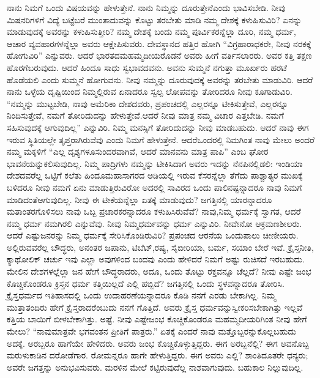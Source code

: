 ನಾನು ನಿಮಗೆ ಒಂದು ವಿಷಯವನ್ನು ಹೇಳುತ್ತೇನೆ. ನಾನು ನಿಮ್ಮನ್ನು ದೂರುತ್ತೇನೆ\break ಎಂದು ಭಾವಿಸಬೇಡಿ. ನೀವು ಮಿಷನರಿಗಳಿಗೆ ವಿದ್ಯೆ ಬಟ್ಟೆಬರೆ ಮುಂತಾದುವನ್ನು ಕೊಟ್ಟು ತರಬೇತು ಮಾಡಿ ನಮ್ಮ ದೇಶಕ್ಕೆ ಕಳುಹಿಸುವಿರಿ? ಏನನ್ನು ಮಾಡುವುದಕ್ಕೆ ಅವರನ್ನು ಕಳುಹಿಸುತ್ತೀರಿ? ನಮ್ಮ ದೇಶಕ್ಕೆ ಬಂದು ನಮ್ಮ ಪೂರ್ವಿಕರನ್ನೆಲ್ಲಾ ದೂರಿ, ನಮ್ಮ ಧರ್ಮ, ಆಚಾರ ವ್ಯವಹಾರಗಳನ್ನೆಲ್ಲಾ ಅವರು ಆಕ್ಷೇಪಿಸುವರು. ದೇವಸ್ಥಾನದ ಹತ್ತಿರ ಹೋಗಿ “ವಿಗ್ರಹಾರಾಧಕರೇ, ನೀವು ನರಕಕ್ಕೆ ಹೋಗುವಿರಿ” ಎನ್ನುವರು. ಆದರೆ ಭಾರತದ\break ಮಹಮ್ಮದೀಯರೊಡನೆ ಅವರು ಹೀಗೆ ವರ್ತಿಸಲಾರರು. ಅವರ ಕತ್ತಿ ತಕ್ಷಣ ಹೊರಗೆ\break ಬರುವುದು. ಆದರೆ ಹಿಂದೂ ಸಾಧು ಸ್ವಭಾವದವನು. ಅವನು ಸುಮ್ಮನೆ ನಗುತ್ತಾ ಮೂರ್ಖರು ಹರಟೆ ಹೊಡೆಯಲಿ ಎಂದು ಸುಮ್ಮನೆ ಹೋಗುವನು. ನೀವು ನಮ್ಮನ್ನು ದೂರುವುದಕ್ಕೆ ಅವರನ್ನು ತರಬೇತು ಮಾಡುವಿರಿ. ಆದರೆ ನಾನು ಒಳ್ಳೆಯ ದೃಷ್ಟಿಯಿಂದ ನಿಮ್ಮಲ್ಲಿರುವ ಏನಾದರೂ ಸ್ವಲ್ಪ ಲೋಪವನ್ನು ತೋರಿದರೂ ನೀವು ಕೂಗಾಡುವಿರಿ. “ನಮ್ಮನ್ನು ಮುಟ್ಟಬೇಡಿ, ನಾವು ಅಮೆರಿಕಾ ದೇಶದವರು, ಪ್ರಪಂಚದಲ್ಲಿ ಎಲ್ಲರನ್ನೂ ಟೀಕಿಸುತ್ತೇವೆ, ಎಲ್ಲರನ್ನೂ ನಿಂದಿಸುತ್ತೇವೆ, ನಮಗೆ ತೋರಿದುದನ್ನು ಹೇಳುತ್ತೇವೆ.\break ಆದರೆ ನೀವು ಮಾತ್ರ ನಮ್ಮ ವಿಚಾರ ಎತ್ತಬೇಡಿ. ನಮಗೆ ಸಹಿಸುವುದಕ್ಕೆ ಆಗುವುದಿಲ್ಲ” ಎನ್ನುವಿರಿ. ನಿಮ್ಮ ಮನಸ್ಸಿಗೆ ತೋರಿದುದನ್ನು ನೀವು ಮಾಡಬಹುದು. ಆದರೆ ನಾವು ಈಗ ಇರುವ ಸ್ಥಿತಿಯಲ್ಲೇ ತೃಪ್ತರಾಗಿರುವೆವು ಎಂದು ನಿಮಗೆ ಹೇಳುತ್ತೇನೆ. ಆದರೆ\break ಒಂದರಲ್ಲಿ ನಿಮಗಿಂತ ನಾವು ಮೇಲು ಅಂದರೆ ನಮ್ಮ ಮಕ್ಕಳಿಗೆ “ಎಲ್ಲ ದೃಶ್ಯಗಳೂ\break ಸುಂದರವಾಗಿವೆ, ಆದರೆ ಮಾನವನು ಮಾತ್ರ ಪಾಪಿ” ಎಂಬ ಘೋರ ಭಾವನೆಯನ್ನು\break ಕಲಿಸುವುದಿಲ್ಲ. ನಿಮ್ಮ ಪಾದ್ರಿಗಳು ನಮ್ಮನ್ನು ಟೀಕಿಸಿದಾಗ ಅವರು ಇದನ್ನು ನೆನಪಿನಲ್ಲಿಡಲಿ: ಇಂಡಿಯಾ ದೇಶದವರೆಲ್ಲ ಒಟ್ಟಿಗೆ ಕಲೆತು ಹಿಂದೂಮಹಾಸಾಗರದ ಅಡಿಯಲ್ಲಿ ಇರುವ ಕೆಸರನ್ನೆಲ್ಲಾ ತೆಗೆದು ಪಾಶ್ಚಾತ್ಯರ ಮುಖಕ್ಕೆ ಬಳಿದರೂ ನೀವು ನಮಗೆ ಏನು ಮಾಡುತ್ತಿರುವಿರೋ ಅದರಲ್ಲಿ ಸಾವಿರದ ಒಂದು ಪಾಲಿನಷ್ಟನ್ನಾದರೂ ನಾವು ನಿಮಗೆ ಮಾಡಿದಂತೆ\break ಆಗುವುದಿಲ್ಲ. ನೀವು ಈ ಟೀಕೆಯನ್ನೆಲ್ಲಾ ಏತಕ್ಕೆ ಮಾಡುವುದು? ಜಗತ್ತಿನಲ್ಲಿ ಯಾರನ್ನಾದರೂ\- ಮತಾಂತರಗೊಳಿಸಲು ನಾವು ಒಬ್ಬ ಪ್ರಚಾರಕರನ್ನಾದರೂ ಕಳುಹಿಸಿರುವೆವೆ? ನಾವು,\break ನಿಮ್ಮ ಧರ್ಮಕ್ಕೆ ಸ್ವಾಗತ, ಆದರೆ ನಮ್ಮ ಧರ್ಮ ನಮಗಿರಲಿ ಎನ್ನುವೆವು. ನೀವು ನಿಮ್ಮ\break ಧರ್ಮವನ್ನು ಧರ್ಮ ಎನ್ನುವಿರಿ. ನೀವೇನೋ ಆಕ್ರಮಣಶೀಲರು. ಆದರೆ ಎಷ್ಟು\break ಜನರನ್ನು ನಿಮ್ಮ ಧರ್ಮಕ್ಕೆ ಸೇರಿಸಿಕೊಂಡಿರುವಿರಿ? ಪ್ರಪಂಚದ ಆರನೆಯ ಒಂದು\break ಪಾಲು ಚೀಣೀಯರು. ಅಲ್ಲಿರುವವರೆಲ್ಲ ಬೌದ್ಧರು, ಅನಂತರ ಜಪಾನು, ಟಿಬೆಟ್​,\break ರಷ್ಯ, ಸೈಬೀರಿಯಾ, ಬರ್ಮ, ಸಯಾಂ ಬೇರೆ ಇವೆ. ಕ್ರೈಸ್ತನೀತಿ, ಕ್ಯಾಥೋಲಿಕ್​ ಚರ್ಚು ಇವು ಎಲ್ಲಾ ಅವುಗಳಿಂದ ಬಂದವು ಎಂದು ಹೇಳಿದರೆ ನಿಮಗೆ ಅಷ್ಟು ರುಚಿಸದೆ ಇರಬಹುದು. ಮೇಲಿನ ದೇಶಗಳಲ್ಲೆಲ್ಲಾ ಜನ ಹೇಗೆ ಬೌದ್ಧರಾದರು, ಅದೂ, ಒಂದು ತೊಟ್ಟು ರಕ್ತವನ್ನೂ ಚೆಲ್ಲದೆ? ನೀವು ಎಷ್ಟೇ ಜಂಭ ಕೊಚ್ಚಿಕೊಂಡರೂ ಕ್ರಿಸ್ತನ ಧರ್ಮ ಕತ್ತಿಯಿಲ್ಲದೆ ಎಲ್ಲಿ ಹಬ್ಬಿದೆ? ಜಗತ್ತಿನಲ್ಲಿ ಒಂದು ಸ್ಥಳವನ್ನಾದರೂ ತೋರಿಸಿ. ಕ್ರೈಸ್ತಧರ್ಮದ ಇತಿಹಾಸದಲ್ಲಿ ಒಂದು ಉದಾಹರಣೆಯನ್ನಾದರೂ ಕೊಡಿ ನನಗೆ ಎರಡು ಬೇಕಾಗಿಲ್ಲ. ನಿಮ್ಮ ಮುತ್ತಾತಂದಿರು ಹೇಗೆ ಕ್ರೈಸ್ತರಾದರೆಂಬುದು ನನಗೆ ಗೊತ್ತಿದೆ. ಅವರು ಕ್ರೈಸ್ತ ಧರ್ಮವನ್ನು\break ಸ್ವೀಕರಿಸಬೇಕಾಗಿತ್ತು ಇಲ್ಲವೆ ಕತ್ತಿಯ ಬಾಯಿಗೆ ಬೀಳಬೇಕಾಗಿತ್ತು. ಅಷ್ಟೆ. ನೀವು ಎಷ್ಟೇ\break ಜಂಭ ಕೊಚ್ಚಿಕೊಂಡರೂ ಮಹಮ್ಮದೀಯರಿಗಿಂತ ನೀವು ಹೇಗೆ ಮೇಲು? “ನಾವು\break ಮಾತ್ರವೇ ಭಗವಂತನ ಪ್ರೀತಿಗೆ ಪಾತ್ರರು.” ಏತಕ್ಕೆ ಎಂದರೆ ನಾವು ಮತ್ತೊಬ್ಬರನ್ನು\break ಕೊಲ್ಲಬಹುದು ಅದಕ್ಕೆ. ಅರಬ್ಬರೂ ಹಾಗೆಯೇ ಹೇಳಿದರು. ಅವರು ಜಂಭ ಕೊಚ್ಚಿ\break ಕೊಳ್ಳುತ್ತಿದ್ದರು. ಈಗ ಅರಬ್ಬನೆಲ್ಲಿ? ಈಗ ಅವನೊಬ್ಬ ಮರುಳುಕಾಡಿನ ದರೋಡೆಗಾರ. ರೋಮನ್ನರೂ ಹಾಗೇ ಹೇಳುತ್ತಿದ್ದರು. ಈಗ ಅವರು ಎಲ್ಲಿ? ಶಾಂತಿದೂತರೇ ಧನ್ಯರು; ಅವರೇ ಜಗತ್ತನ್ನು ಅನುಭವಿಸುವರು. ಮರಳಿನ ಮೇಲೆ ಕಟ್ಟಿರುವುದೆಲ್ಲ ನಾಶವಾಗುವುದು. ಬಹುಕಾಲ ನಿಲ್ಲುವುದಿಲ್ಲ.

